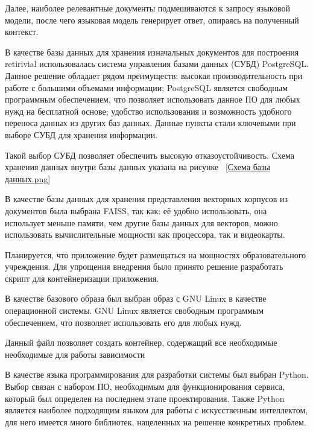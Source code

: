 Далее, наиболее релевантные документы подмешиваются к запросу языковой модели,
после чего языковая модель генерирует ответ, опираясь на полученный контекст.


В качестве базы данных для хранения изначальных документов для построения 
retirivial использовалась система управления базами данных (СУБД) PostgreSQL.
Данное решение обладает рядом преимуществ: высокая производительность при 
работе с большими объемами информации; PostgreSQL является свободным 
программным обеспечением, что позволяет использовать данное ПО для любых 
нужд на бесплатной основе; удобство использования и возможность удобного 
переноса данных из других баз данных. Данные пункты стали ключевыми при выборе 
СУБД для хранения информации. 

Такой выбор СУБД позволяет обеспечить высокую отказоустойчивость. Схема 
хранения данных внутри базы данных указана на рисунке
~\ref{Схема базы данных.png}

В качестве базы данных для хранения представления векторных корпусов из 
документов была выбрана FAISS, так как: её удобно использовать, она использует
меньше памяти, чем другие базы данных для векторов, можно использовать 
вычислительные мощности как процессора, так и видеокарты.


Планируется, что приложение будет размещаться на мощностях образовательного
учреждения. Для упрощения внедрения было принято решение разработать скрипт
для контейнеризации приложения.

В качестве базового образа был выбран образ с GNU Linux в качестве
операционной системы.
GNU Linux является свободным программым обеспечением, что позволяет
использовать его для любых нужд.

Данный файл позволяет создать контейнер, содержащий все необходимые 
необходимые для работы зависимости


В качестве языка программирования для разработки системы был выбран Python. 
Выбор связан с набором ПО, необходимым для функционирования сервиса, который
был определен на последнем этапе проектирования. Также Python является
наиболее подходящим языком для работы с искусственным интеллектом, для
него имеется много библиотек, нацеленных на решение конкретных проблем.

